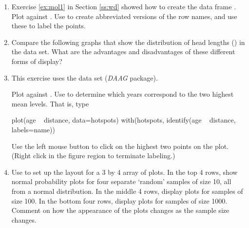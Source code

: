 \begin{enumerate}
\item Exercise \ref{ex:mol1} in Section \ref{ss:wd} showed how to
create the data frame .  Plot 
  against . Use  to create abbreviated
  versions of the row names, and use these to label the
  points.\label{ex:molclock}

\item Compare the following graphs that show the distribution of head
  lengths () in the  data set.
What are the advantages and disadvantages of these different
forms of display?

\item This exercise uses the data set 
  (\textit{DAAG} package).

Plot  against .  Use  to
determine which years correspond to the two highest mean levels. That
is, type
\begin{Schunk}
\begin{Sinput}
plot(age ~ distance, data=hotspots)
with(hotspots, identify(age ~ distance, labels=name))
\end{Sinput}
\end{Schunk}
Use the left mouse button to click on the highest two points
on the plot. (Right click in the figure region to terminate labeling.)

\item Use  to set up the layout for a 3 by 4 array
of plots. In the top 4 rows, show normal probability plots
for four separate `random' samples of size 10, all from
a normal distribution. In the middle 4 rows, display plots for
samples of size 100. In the bottom four rows, display plots for
samples of size 1000. Comment on how the appearance of the plots
changes as the sample size changes.


\end{enumerate}
